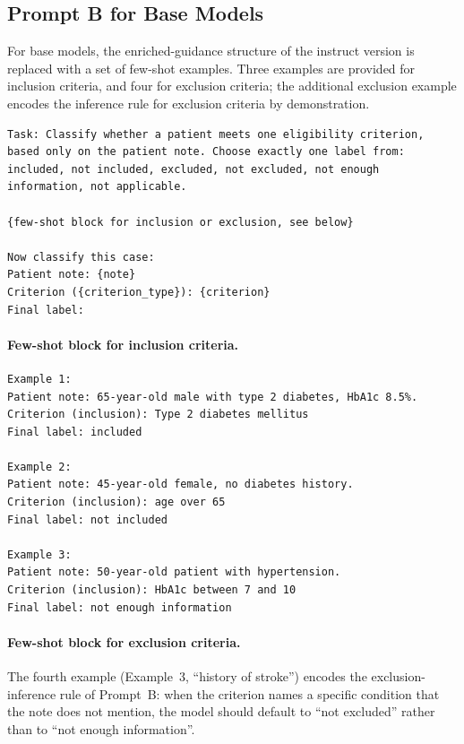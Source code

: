 \subsection{Prompt B for Base Models}

For base models, the enriched-guidance structure of the instruct 
version is replaced with a set of few-shot examples. Three examples 
are provided for inclusion criteria, and four for exclusion criteria; 
the additional exclusion example encodes the inference rule for 
exclusion criteria by demonstration.

\begin{lstlisting}[caption={Prompt B for Base models --- common 
    frame}, label={lst:prompt-b-base-frame}, 
    breaklines=true, basicstyle=\ttfamily\small]
Task: Classify whether a patient meets one eligibility criterion,
based only on the patient note. Choose exactly one label from:
included, not included, excluded, not excluded, not enough
information, not applicable.

{few-shot block for inclusion or exclusion, see below}

Now classify this case:
Patient note: {note}
Criterion ({criterion_type}): {criterion}
Final label:
\end{lstlisting}

\paragraph{Few-shot block for inclusion criteria.}

\begin{lstlisting}[caption={Prompt B for Base models --- inclusion 
    few-shot examples}, label={lst:prompt-b-base-incl}, 
    breaklines=true, basicstyle=\ttfamily\small]
Example 1:
Patient note: 65-year-old male with type 2 diabetes, HbA1c 8.5%.
Criterion (inclusion): Type 2 diabetes mellitus
Final label: included

Example 2:
Patient note: 45-year-old female, no diabetes history.
Criterion (inclusion): age over 65
Final label: not included

Example 3:
Patient note: 50-year-old patient with hypertension.
Criterion (inclusion): HbA1c between 7 and 10
Final label: not enough information
\end{lstlisting}

\paragraph{Few-shot block for exclusion criteria.}
The fourth example (Example~3, ``history of stroke'') encodes the 
exclusion-inference rule of Prompt~B: when the criterion names a 
specific condition that the note does not mention, the model should 
default to ``not excluded'' rather than to ``not enough information''.

